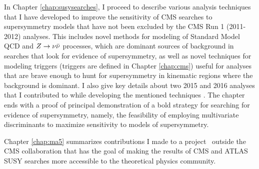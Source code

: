 In Chapter \ref{chap:susysearches}, I proceed to describe various analysis techniques that I have developed to improve the sensitivity of CMS searches to supersymmetry models that have not been excluded by the CMS Run 1 (2011-2012) analyses. This includes novel methods for modeling of Standard Model QCD and $Z\rightarrow \nu\bar{\nu}$ processes, which are dominant sources of background in searches that look for evidence of supersymmetry, as well as novel techniques for modeling triggers (triggers are defined in Chapter \ref{chap:cms}) useful for analyses that are brave enough to hunt for supersymmetry in kinematic regions where the background is dominant. I also give key details about two 2015 and 2016 analyses that I contributed to while developing the mentioned techniques \cite{Khachatryan:2016kdk}\cite{CMS:2016nhb}. The chapter ends with a proof of principal demonstration of a bold strategy for searching for evidence of supersymmetry, namely, the feasibility of employing multivariate discriminants to maximize sensitivity to models of supersymmetry.

Chapter \ref{chap:ma5} summarizes contributions I made to a project~\cite{Dumont:2014tja} outside the CMS collaboration that has the goal of making the results of CMS and ATLAS SUSY searches more accessible to the theoretical physics community. 

